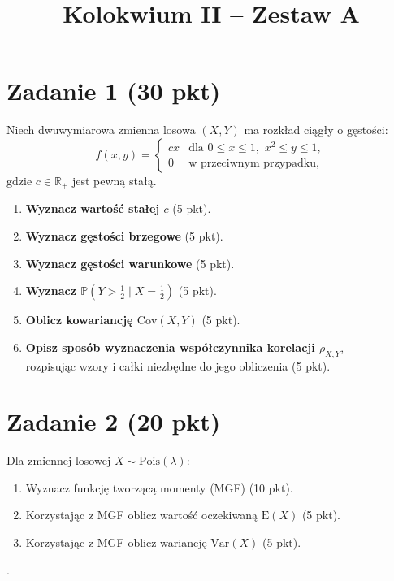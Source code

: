 \documentclass[polish, 10pt]{extarticle}
\begin{document}
\title{Kolokwium II -- Zestaw A}
\author{}
\date{}

\maketitle
\vspace{-2cm}

\section*{Zadanie 1 (30 pkt)}
Niech dwuwymiarowa zmienna losowa $(X, Y)$ ma rozkład ciągły o gęstości:
\[
f(x,y) = 
\begin{cases} 
cx & \text{dla } 0 \le x \le 1, \,\, x^2 \le y \le 1, \\
0 & \text{w przeciwnym przypadku,}
\end{cases}
\]
gdzie $c \in \mathbb{R_+}$ jest pewną stałą.

\begin{enumerate}
    \item[a)] \textbf{Wyznacz wartość stałej $c$} \hfill (5 pkt).
    \item[b)] \textbf{Wyznacz gęstości brzegowe} \hfill (5 pkt).
    \item[c)] \textbf{Wyznacz gęstości warunkowe} \hfill (5 pkt).
    \item[d)] \textbf{Wyznacz $\mathbb P\!\left(Y>\tfrac12\mid X=\tfrac12\right)$} \hfill (5 pkt).
    \item[e)] \textbf{Oblicz kowariancję $\text{Cov}(X, Y)$} \hfill (5 pkt).
    \item[f)] \textbf{Opisz sposób wyznaczenia współczynnika korelacji $\rho_{X,Y}$},\\rozpisując wzory i całki niezbędne do jego obliczenia \hfill (5 pkt).
\end{enumerate}

\section*{Zadanie 2 (20 pkt)}
Dla zmiennej losowej $X\sim \mathrm{Pois}(\lambda)$:
\begin{enumerate}
  \item[a)] Wyznacz funkcję tworzącą momenty (MGF) \hfill (10 pkt).
  \item[b)] Korzystając z MGF oblicz wartość oczekiwaną $\mathrm{E}(X)$ \hfill (5 pkt).
  \item[c)] Korzystając z MGF oblicz wariancję $\mathrm{Var}(X)$ \hfill (5 pkt).
\end{enumerate}. 
\end{document}
